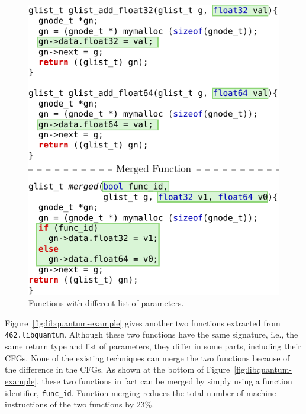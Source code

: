 \begin{figure}[t!]
  \centering
  \includegraphics[width=.95\linewidth]{figs/sphinx-example.pdf}
  \caption{Functions with different list of parameters.}
  \label{fig:sphinx-example}
\end{figure}


Figure~\ref{fig:libquantum-example} gives another two functions extracted from \texttt{462.libquantum}. Although these two functions have
the same signature, i.e., the same return type and list of parameters, they differ in some parts, including their CFGs. None of the
existing techniques can merge the two functions because of the difference in the CFGs. As shown at the bottom of
Figure~\ref{fig:libquantum-example}, these two functions in fact can be merged by simply using a function identifier, \texttt{func\_id}.
Function merging reduces the total number of machine instructions of the two functions by 23\%.


